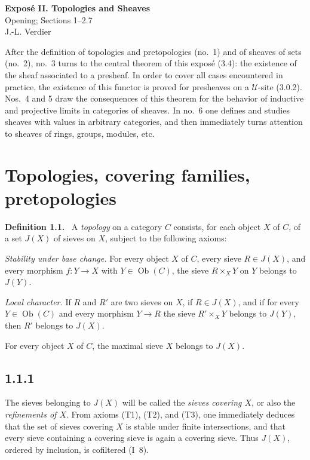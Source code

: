 \documentclass[11pt]{article}
\newcommand{\U}{\mathcal{U}}
\newcommand{\ob}{\operatorname{Ob}}
\newcommand{\etcn}{etc.}
\newenvironment{statement}[1]{\par\medskip\noindent\textbf{#1.}\ }{\par\medskip}
\begin{document}
\begin{center}
{\Large \textbf{Expos\'e II. Topologies and Sheaves}}\\[0.35em]
{\large Opening; Sections 1--2.7}\\[0.35em]
J.-L. Verdier
\end{center}

\bigskip


\bigskip

After the definition of topologies and pretopologies (no.~1) and of sheaves of sets (no.~2), no.~3 turns to the central theorem of this expos\'e (3.4): the existence of the sheaf associated to a presheaf. In order to cover all cases encountered in practice, the existence of this functor is proved for presheaves on a \(\U\)-site (3.0.2). Nos.~4 and 5 draw the consequences of this theorem for the behavior of inductive and projective limits in categories of sheaves. In no.~6 one defines and studies sheaves with values in arbitrary categories, and then immediately turns attention to sheaves of rings, groups, modules, \etcn

\section{Topologies, covering families, pretopologies}

\begin{statement}{Definition 1.1}
A \emph{topology} on a category \(C\) consists, for each object \(X\) of \(C\), of a set \(J(X)\) of sieves on \(X\), subject to the following axioms:
\begin{description}[leftmargin=2.8em,style=nextline]
\item[T 1)] \emph{Stability under base change.} For every object \(X\) of \(C\), every sieve \(R\in J(X)\), and every morphism \(f:Y\to X\) with \(Y\in\ob(C)\), the sieve \(R\times_XY\) on \(Y\) belongs to \(J(Y)\).

\item[T 2)] \emph{Local character.} If \(R\) and \(R'\) are two sieves on \(X\), if \(R\in J(X)\), and if for every \(Y\in\ob(C)\) and every morphism \(Y\to R\) the sieve \(R'\times_XY\) belongs to \(J(Y)\), then \(R'\) belongs to \(J(X)\).

\item[T 3)] For every object \(X\) of \(C\), the maximal sieve \(X\) belongs to \(J(X)\).
\end{description}
\end{statement}

\subsection*{1.1.1}
The sieves belonging to \(J(X)\) will be called the \emph{sieves covering \(X\)}, or also the \emph{refinements of \(X\)}. From axioms (T1), (T2), and (T3), one immediately deduces that the set of sieves covering \(X\) is stable under finite intersections, and that every sieve containing a covering sieve is again a covering sieve. Thus \(J(X)\), ordered by inclusion, is cofiltered (I~8).
\end{document}
